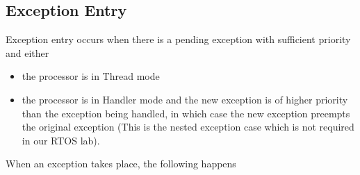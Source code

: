 \subsection{Exception Entry}
Exception entry occurs when there is a pending exception with sufficient priority and either
\begin{itemize}
\item the processor is in Thread mode
\item the processor is in Handler mode and the new exception is of higher priority than the exception being handled, in which case the new exception preempts the original exception (This is the nested exception case which is not required in our RTOS lab).
\end{itemize}
When an exception takes place, the following happens

